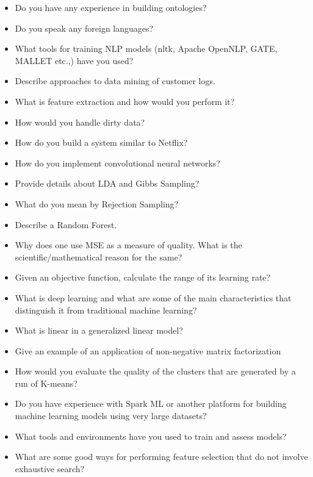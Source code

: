 \documentclass{article}
\begin{document}
\begin{itemize}
	\item Do you have any experience in building ontologies?
	\item Do you speak any foreign languages?
	\item What tools for training NLP models (nltk, Apache OpenNLP, GATE, MALLET etc.,) have you used?
	\item Describe approaches to data mining of customer logs.
	\item What is feature extraction and how would you perform it?
	\item How would you handle dirty data?
	\item How do you build a system similar to Netflix?
	\item How do you implement convolutional neural networks?
	\item Provide details about LDA and Gibbs Sampling?
	\item What do you mean by Rejection Sampling?
	\item Describe a Random Forest.
	\item Why does one use MSE as a measure of quality. What is the scientific/mathematical reason for the same?
	\item Given an objective function, calculate the range of its learning rate?
	\item What is deep learning and what are some of the main characteristics that distinguish it from traditional machine learning?
	\item What is linear in a generalized linear model?
	\item Give an example of an application of non-negative matrix factorization
	\item How would you evaluate the quality of the clusters that are generated by a run of K-means?
	\item Do you have experience with Spark ML or another platform for building machine learning models using very large datasets?
	\item What tools and environments have you used to train and assess models?
	\item What are some good ways for performing feature selection that do not involve exhaustive search? 
\end{itemize}
\end{document}
